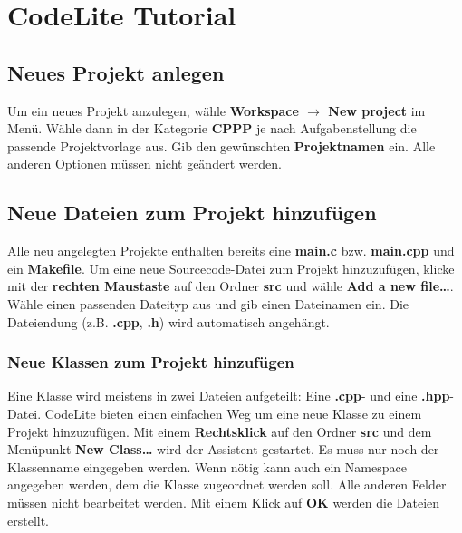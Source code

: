 \def\additionalOptionsForClass{nochapname,bigchapter}




\cppSetHeaderAndMakeTitle

\section{CodeLite Tutorial}

\subsection{Neues Projekt anlegen}
Um ein neues Projekt anzulegen, wähle \textbf{Workspace $\rightarrow$ New project} im Menü. Wähle dann in der Kategorie \textbf{CPPP} je nach Aufgabenstellung die passende Projektvorlage aus.
Gib den gewünschten \textbf{Projektnamen} ein. Alle anderen Optionen müssen nicht geändert werden.

\subsection{Neue Dateien zum Projekt hinzufügen}
Alle neu angelegten Projekte enthalten bereits eine \textbf{main.c} bzw. \textbf{main.cpp} und ein \textbf{Makefile}.
Um eine neue Sourcecode-Datei zum Projekt hinzuzufügen, klicke mit der \textbf{rechten Maustaste} auf den Ordner \textbf{src} und wähle \textbf{Add a new file\dots}.
Wähle einen passenden Dateityp aus und gib einen Dateinamen ein.
Die Dateiendung (z.B. \textbf{.cpp}, \textbf{.h}) wird automatisch angehängt.

\subsubsection{Neue Klassen zum Projekt hinzufügen}
Eine Klasse wird meistens in zwei Dateien aufgeteilt: Eine \textbf{.cpp}- und eine \textbf{.hpp}-Datei. CodeLite bieten einen einfachen Weg um eine neue Klasse zu einem Projekt hinzuzufügen. Mit einem \textbf{Rechtsklick} auf den Ordner \textbf{src} und dem Menüpunkt \textbf{New Class\dots} wird der Assistent gestartet. Es muss nur noch der Klassenname eingegeben werden. Wenn nötig kann auch ein Namespace angegeben werden, dem die Klasse zugeordnet werden soll. Alle anderen Felder müssen nicht bearbeitet werden. Mit einem Klick auf \textbf{OK} werden die Dateien erstellt.


